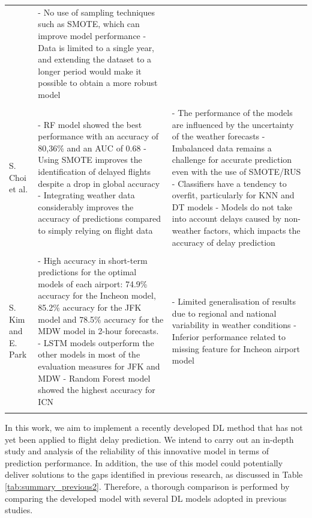\documentclass[12pt,oneside]{book} %
\begin{document}
\begin{longtable}{>{\raggedright\arraybackslash}p{2.5cm} p{7.3cm} >{\raggedright\arraybackslash}p{7.3cm}}
& - No use of sampling techniques such as SMOTE, which can improve model performance
\newline - Data is limited to a single year, and extending the dataset to a longer period would make it possible to obtain a more robust model
\\
& & 
\\
S. Choi et al. \cite{choi}  
& - RF model showed the best performance with an accuracy of 80,36\% and an AUC of 0.68
\newline - Using SMOTE improves the identification of delayed flights despite a drop in global accuracy
\newline - Integrating weather data considerably improves the accuracy of predictions compared to simply relying on flight data
& - The performance of the models are influenced by the uncertainty of the weather forecasts
\newline- Imbalanced data remains a challenge for accurate prediction even with the use of SMOTE/RUS
\newline - Classifiers have a tendency to overfit, particularly for KNN and DT models
\newline - Models do not take into account delays caused by non-weather factors, which impacts the accuracy of delay prediction
\\
& & 
\\
S. Kim and E. Park \cite{kim}
& - High accuracy in short-term predictions for the optimal models of each airport: 74.9\% accuracy for the Incheon model, 85.2\% accuracy for the JFK model and 78.5\% accuracy for the MDW model in 2-hour forecasts.
\newline -  LSTM models outperform the other models in most of the evaluation measures for JFK and MDW
\newline - Random Forest model showed the highest accuracy for ICN
& - Limited generalisation of results due to regional and national variability in weather conditions
\newline - Inferior performance related to missing feature for Incheon airport model
\\
& & 
\\ 

\end{longtable}

\noindent In this work, we aim to implement a recently developed DL method that has not yet been applied to flight delay prediction. We intend to carry out an in-depth study and analysis of the reliability of this innovative model in terms of prediction performance. In addition, the use of this model could potentially deliver solutions to the gaps identified in previous research, as discussed in Table \ref{tab:summary_previous2}. Therefore, a thorough comparison is performed by comparing the developed model with several DL models adopted in previous studies.
\end{document}
